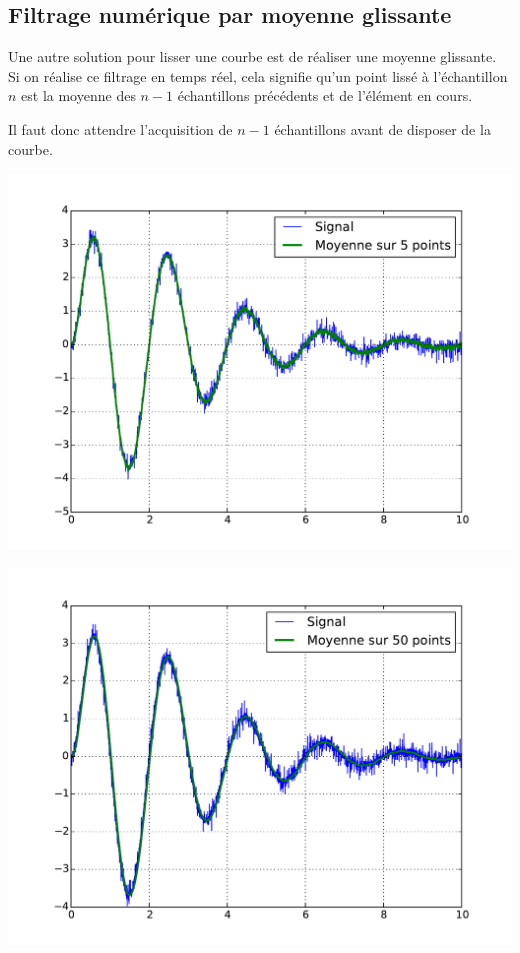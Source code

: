 \documentclass[10pt,fleqn]{article} %
\begin{document}
\subsection{Filtrage numérique par moyenne glissante}
Une autre solution pour lisser une courbe est de réaliser une moyenne glissante. Si on réalise ce filtrage en temps réel, cela signifie qu'un point lissé à l'échantillon $n$ est la moyenne des $n-1$ échantillons précédents et de l'élément en cours. 

Il faut donc attendre l'acquisition de $n-1$ échantillons avant de disposer de la courbe.


\begin{minipage}[c]{.43\linewidth}
\begin{center}
\includegraphics[width=\textwidth]{images/moyenne_1}
\end{center}
\end{minipage} \hfill
\begin{minipage}[c]{.43\linewidth}
\begin{center}
\includegraphics[width=\textwidth]{images/moyenne_2}
\end{center}
\end{minipage} 
\end{document}
